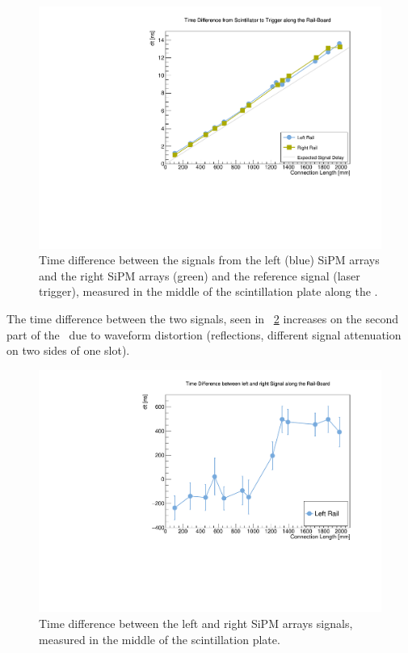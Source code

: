\documentclass[../BTOF_summary.tex]{subfiles}
\begin{document}
\begin{figure}[htbp]
    \centering
    \includegraphics[scale=0.5]{Pictures/TimeDiff_toTrigger.pdf}
    \caption{Time difference between the signals from the left (blue) SiPM arrays and the right SiPM arrays (green) and the reference signal (laser trigger), measured in the middle of the scintillation plate along the \railboard.}
    \label{fig:DiffTr}
\end{figure}

The time difference between the two signals, seen in \fig~\ref{fig:Diff} increases on the second part of the \railboard\ due to waveform distortion (reflections, different signal attenuation on two sides of one slot).

\begin{figure}[htbp]
    \centering
    \includegraphics[scale=0.5]{Pictures/TimeDiff_leftRight.pdf}
    \caption{Time difference between the left and right SiPM arrays signals, measured in the middle of the scintillation plate.}
    \label{fig:Diff}
\end{figure}
\end{document}
